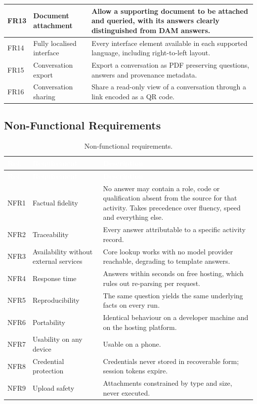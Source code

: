 \begin{longtable}{|p{}|p{}|p{}|}
FR13 & Document attachment & Allow a supporting document to be attached and queried, with its answers clearly distinguished from DAM answers. \\ \hline
FR14 & Fully localised interface & Every interface element available in each supported language, including right-to-left layout. \\ \hline
FR15 & Conversation export & Export a conversation as PDF preserving questions, answers and provenance metadata. \\ \hline
FR16 & Conversation sharing & Share a read-only view of a conversation through a link encoded as a QR code. \\ \hline
\end{longtable}

\subsection{Non-Functional Requirements}


\begin{longtable}{|p{}|p{}|p{}|}
\caption{Non-functional requirements.}\label{tab:nfr}\\
\hline
\rowcolor{myblue}\textcolor{white}{\textbf{Ref.}} & \textcolor{white}{\textbf{Requirement}} & \textcolor{white}{\textbf{Description}} \\
\hline
\endfirsthead
\hline
\rowcolor{myblue}\textcolor{white}{\textbf{Ref.}} & \textcolor{white}{\textbf{Requirement}} & \textcolor{white}{\textbf{Description}} \\
\hline
\endhead
NFR1 & Factual fidelity & No answer may contain a role, code or qualification absent from the source for that activity. Takes precedence over fluency, speed and everything else. \\ \hline
NFR2 & Traceability & Every answer attributable to a specific activity record. \\ \hline
NFR3 & Availability without external services & Core lookup works with no model provider reachable, degrading to template answers. \\ \hline
NFR4 & Response time & Answers within seconds on free hosting, which rules out re-parsing per request. \\ \hline
NFR5 & Reproducibility & The same question yields the same underlying facts on every run. \\ \hline
NFR6 & Portability & Identical behaviour on a developer machine and on the hosting platform. \\ \hline
NFR7 & Usability on any device & Usable on a phone. \\ \hline
NFR8 & Credential protection & Credentials never stored in recoverable form; session tokens expire. \\ \hline
NFR9 & Upload safety & Attachments constrained by type and size, never executed. \\ \hline
\end{longtable}


